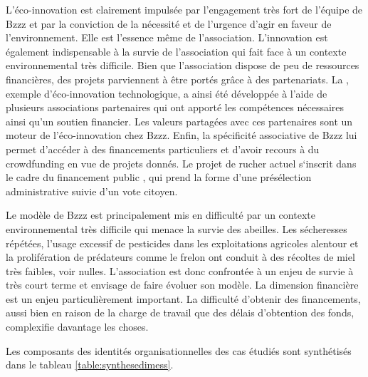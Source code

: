        L’éco-innovation est clairement impulsée par l’engagement très fort de l’équipe de Bzzz et par la conviction de la nécessité et de l’urgence d’agir en faveur de l’environnement. Elle est l’essence même de l’association. L’innovation est également indispensable à la survie de l’association qui fait face à un contexte environnemental très difficile. Bien que l’association dispose de peu de ressources financières, des projets parviennent à être portés grâce à des partenariats. La , exemple d’éco-innovation technologique, a ainsi été développée à l’aide de plusieurs associations partenaires qui ont apporté les compétences nécessaires ainsi qu’un soutien financier. Les valeurs partagées avec ces partenaires sont un moteur de l’éco-innovation chez Bzzz. Enfin, la spécificité associative de Bzzz lui permet d’accéder à des financements particuliers et d’avoir recours à du crowdfunding en vue de projets donnés. Le projet de rucher actuel s‘inscrit dans le cadre du financement public , qui prend la forme d’une présélection administrative suivie d’un vote citoyen.

        Le modèle de Bzzz est principalement mis en difficulté par un contexte environnemental très difficile qui menace la survie des abeilles. Les sécheresses répétées, l’usage excessif de pesticides dans les exploitations agricoles alentour et la prolifération de prédateurs comme le frelon ont conduit à des récoltes de miel très faibles, voir nulles. L’association est donc confrontée à un enjeu de survie à très court terme et envisage de faire évoluer son modèle. La dimension financière est un enjeu particulièrement important. La difficulté d’obtenir des financements, aussi bien en raison de la charge de travail que des délais d’obtention des fonds, complexifie davantage les choses.

    \transition
    
    Les composants des identités organisationnelles des cas étudiés sont synthétisés dans le tableau \ref{table:synthesedimess}.

